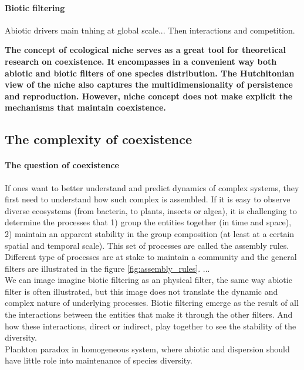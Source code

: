 \paragraph{Biotic filtering}

Abiotic drivers main tnhing at global scale... Then interactions and competition.

\textbf{The concept of ecological niche serves as a great tool for theoretical research on coexistence. It encompasses in a convenient way both abiotic and biotic filters of one species distribution. The Hutchitonian view of the niche also captures the multidimensionality of persistence and reproduction. However, niche concept does not make explicit the mechanisms that maintain coexistence.}


\subsection{The complexity of coexistence}

\paragraph{The question of coexistence}
If ones want to better understand and predict dynamics of complex systems, they first need to understand how such complex is assembled. If it is easy to observe diverse ecosystems (from bacteria, to plants, insects or algea), it is challenging to determine the processes that 1) group the entities together (in time and space), 2) maintain an apparent stability in the group composition (at least at a certain spatial and temporal scale). This set of processes are called the assembly rules. Different type of processes are at stake to maintain a community and the general filters are illustrated in the figure \ref{fig:assembly_rules}. ...\\
We can image imagine biotic filtering as an physical filter, the same way abiotic filter is often illustrated, but this image does not translate the dynamic and complex nature of underlying processes. Biotic filtering emerge as the result of all the interactions between the entities that make it through the other filters. And how these interactions, direct or indirect, play together to see the stability of the diversity.\\
Plankton paradox in homogeneous system, where abiotic and dispersion should have little role into maintenance of species diversity.\\
																			
